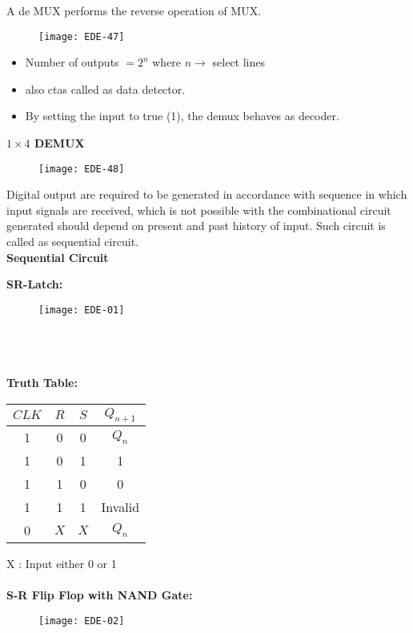 A de MUX performs the reverse operation of MUX.
\begin{figure}[H]
	\centering
	\texttt{[image: EDE-47]}
\end{figure}
\begin{itemize}
	\item Number of outputs $=2^{n}$ where $n \rightarrow$ select lines
	\item  also ctas called as data detector.
	\item By setting the input to true (1), the demux behaves as decoder.
\end{itemize}
\textbf{$1 \times 4$ DEMUX}
\begin{figure}[H]
	\centering
	\texttt{[image: EDE-48]}
\end{figure}
Digital output are required to be generated in accordance with sequence in which input signals are received, which is not possible with the combinational circuit generated should depend on present and past history of input. Such circuit is called as sequential circuit.\\
\textbf{Sequential Circuit}\\
\begin{minipage}{0.12\textwidth}
	\textbf{SR-Latch:}
\end{minipage}
\begin{minipage}{0.45\textwidth}
	\begin{figure}[H]
		\centering
		\texttt{[image: EDE-01]}
	\end{figure}
\end{minipage}\\\\\\
\textbf{Truth Table:}
\begin{tabular}{|c|c|c|c|}
	\hline$C L K$ & $R$ & $S$ & $Q_{n+1}$ \\
	\hline 1 & 0 & 0 & $Q_{n}$ \\
	\hline 1 & 0 & 1 & 1 \\
	\hline 1 & 1 & 0 & 0 \\
	\hline 1 & 1 & 1 & Invalid \\
	\hline 0 & $X$ & $X$ & $Q_{n}$ \\
	\hline
\end{tabular}
$\mathrm{X}$ : Input either 0 or 1\\\\
\textbf { S-R Flip Flop with NAND Gate: }
\begin{figure}[H]
	\centering
	\texttt{[image: EDE-02]}
\end{figure}
